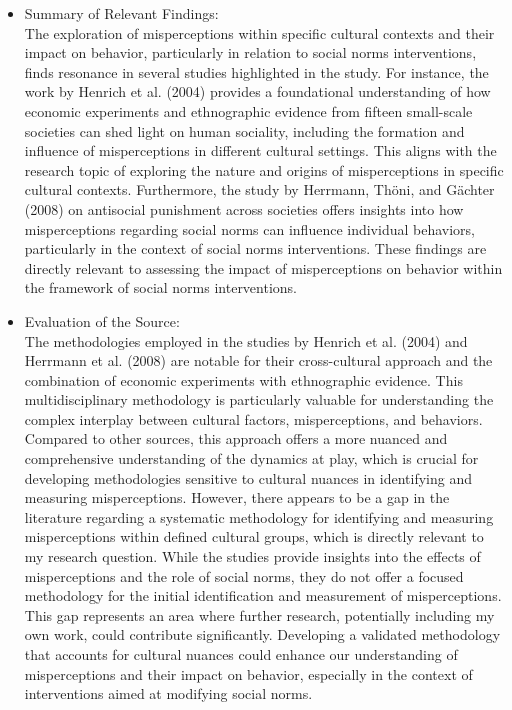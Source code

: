 \documentclass{article}
\begin{document}
    \begin{itemize}
        \item Summary of Relevant Findings:\\
The exploration of misperceptions within specific cultural contexts and their impact on behavior, particularly in relation to social norms interventions, finds resonance in several studies highlighted in the study. For instance, the work by Henrich et al. (2004) provides a foundational understanding of how economic experiments and ethnographic evidence from fifteen small-scale societies can shed light on human sociality, including the formation and influence of misperceptions in different cultural settings. This aligns with the research topic of exploring the nature and origins of misperceptions in specific cultural contexts. Furthermore, the study by Herrmann, Thöni, and Gächter (2008) on antisocial punishment across societies offers insights into how misperceptions regarding social norms can influence individual behaviors, particularly in the context of social norms interventions. These findings are directly relevant to assessing the impact of misperceptions on behavior within the framework of social norms interventions.
    \end{itemize}
    \begin{itemize}
        \item Evaluation of the Source:\\
The methodologies employed in the studies by Henrich et al. (2004) and Herrmann et al. (2008) are notable for their cross-cultural approach and the combination of economic experiments with ethnographic evidence. This multidisciplinary methodology is particularly valuable for understanding the complex interplay between cultural factors, misperceptions, and behaviors. Compared to other sources, this approach offers a more nuanced and comprehensive understanding of the dynamics at play, which is crucial for developing methodologies sensitive to cultural nuances in identifying and measuring misperceptions.
However, there appears to be a gap in the literature regarding a systematic methodology for identifying and measuring misperceptions within defined cultural groups, which is directly relevant to my research question. While the studies provide insights into the effects of misperceptions and the role of social norms, they do not offer a focused methodology for the initial identification and measurement of misperceptions. This gap represents an area where further research, potentially including my own work, could contribute significantly. Developing a validated methodology that accounts for cultural nuances could enhance our understanding of misperceptions and their impact on behavior, especially in the context of interventions aimed at modifying social norms.
    \end{itemize}
\end{document}
